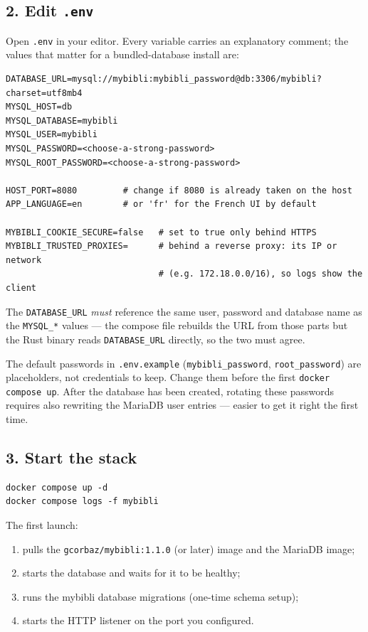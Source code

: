 \subsection*{2. Edit \texttt{.env}}

Open \texttt{.env} in your editor. Every variable carries an
explanatory comment; the values that matter for a bundled-database
install are:

\begin{lstlisting}
DATABASE_URL=mysql://mybibli:mybibli_password@db:3306/mybibli?charset=utf8mb4
MYSQL_HOST=db
MYSQL_DATABASE=mybibli
MYSQL_USER=mybibli
MYSQL_PASSWORD=<choose-a-strong-password>
MYSQL_ROOT_PASSWORD=<choose-a-strong-password>

HOST_PORT=8080         # change if 8080 is already taken on the host
APP_LANGUAGE=en        # or 'fr' for the French UI by default

MYBIBLI_COOKIE_SECURE=false   # set to true only behind HTTPS
MYBIBLI_TRUSTED_PROXIES=      # behind a reverse proxy: its IP or network
                              # (e.g. 172.18.0.0/16), so logs show the client
\end{lstlisting}

The \texttt{DATABASE\_URL} \emph{must} reference the same user,
password and database name as the \texttt{MYSQL\_*} values — the
compose file rebuilds the URL from those parts but the Rust binary
reads \texttt{DATABASE\_URL} directly, so the two must agree.

\begin{warning}
The default passwords in \texttt{.env.example}
(\texttt{mybibli\_password}, \texttt{root\_password}) are
placeholders, not credentials to keep. Change them before the first
\texttt{docker compose up}. After the database has been created,
rotating these passwords requires also rewriting the MariaDB user
entries — easier to get it right the first time.
\end{warning}

\subsection*{3. Start the stack}

\begin{lstlisting}
docker compose up -d
docker compose logs -f mybibli
\end{lstlisting}

The first launch:

\begin{enumerate}
  \item pulls the \texttt{gcorbaz/mybibli:1.1.0} (or later) image
        and the MariaDB image;
  \item starts the database and waits for it to be healthy;
  \item runs the mybibli database migrations
        (one-time schema setup);
  \item starts the HTTP listener on the port you configured.
\end{enumerate}

